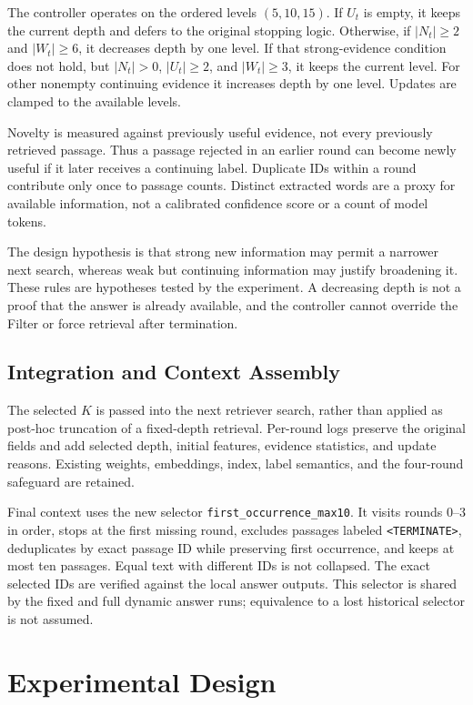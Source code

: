 \documentclass[conference]{IEEEtran}
\begin{document}
The controller operates on the ordered levels $(5,10,15)$. If $U_t$ is empty, it keeps the current depth and defers to the original stopping logic. Otherwise, if $|N_t|\geq2$ and $|W_t|\geq6$, it decreases depth by one level. If that strong-evidence condition does not hold, but $|N_t|>0$, $|U_t|\geq2$, and $|W_t|\geq3$, it keeps the current level. For other nonempty continuing evidence it increases depth by one level. Updates are clamped to the available levels.

Novelty is measured against previously useful evidence, not every previously retrieved passage. Thus a passage rejected in an earlier round can become newly useful if it later receives a continuing label. Duplicate IDs within a round contribute only once to passage counts. Distinct extracted words are a proxy for available information, not a calibrated confidence score or a count of model tokens.

The design hypothesis is that strong new information may permit a narrower next search, whereas weak but continuing information may justify broadening it. These rules are hypotheses tested by the experiment. A decreasing depth is not a proof that the answer is already available, and the controller cannot override the Filter or force retrieval after termination.

\subsection{Integration and Context Assembly}
The selected $K$ is passed into the next retriever search, rather than applied as post-hoc truncation of a fixed-depth retrieval. Per-round logs preserve the original fields and add selected depth, initial features, evidence statistics, and update reasons. Existing weights, embeddings, index, label semantics, and the four-round safeguard are retained.

Final context uses the new selector \texttt{first\_occurrence\_max10}. It visits rounds 0--3 in order, stops at the first missing round, excludes passages labeled \texttt{<TERMINATE>}, deduplicates by exact passage ID while preserving first occurrence, and keeps at most ten passages. Equal text with different IDs is not collapsed. The exact selected IDs are verified against the local answer outputs. This selector is shared by the fixed and full dynamic answer runs; equivalence to a lost historical selector is not assumed.

\section{Experimental Design}
\end{document}
